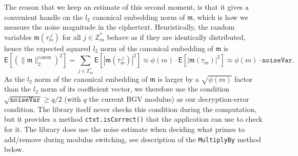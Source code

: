 \documentclass[14pt]{extarticle}
\newcommand{\Z}{\mathbb{Z}}
\def\EXP{\mathsf{E}}
\newcommand{\mm}{\mathfrak{m}}
\begin{document}
The reason that we keep an estimate of this second moment, is that it
gives a convenient handle on the $l_2$ canonical embedding norm of
$\mm$, which is how we measure the noise magnitude in the ciphertext.
Heuristically, the random variables $\mm(\tau_m^{\;j})$ for all $j\in
\Z_m^*$ behave as if they are identically distributed, hence the
expected squared $l_2$ norm of the canonical embedding of $\mm$ is
\[
\EXP\left[(\|\mm\|_2^{\mathrm{canon}})^2\right]
= \sum_{j\in \Z_m^*}\EXP\left[\left|\mm(\tau_m^{\;j})\right|^2\right]
\approx \phi(m)\cdot\EXP\left[\left|\mm(\tau_m)\right|^2\right]
\approx \phi(m)\cdot\mathtt{noiseVar}.
\]
As the $l_2$ norm of the canonical embedding of $\mm$ is larger by a
$\sqrt{\phi(m)}$ factor than the $l_2$ norm of its coefficient vector,
we therefore use the condition $\sqrt{\mathtt{noiseVar}}\ge q/2$ (with
$q$ the current BGV modulus) as our decryption-error condition. The
library itself never checks this condition during the computation, but
it provides a method \texttt{ctxt.isCorrect()} that the application can
use to check for it. The library does use the noise estimate
when deciding what primes to add/remove during modulus switching, see
description of the \texttt{MultiplyBy} method below.
\end{document}
